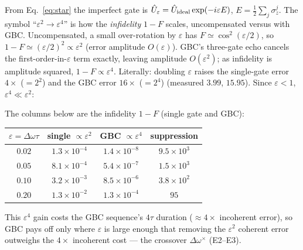 \documentclass[aps,prapplied,twocolumn,superscriptaddress,floatfix,nofootinbib]{revtex4-2}
\begin{document}
From Eq.~\eqref{eq:star} the imperfect gate is $\hat U_\varepsilon=\hat U_{\rm ideal}\exp(-i\varepsilon E)$,
$E=\tfrac12\sum_j\sigma_z^j$. The symbol ``$\varepsilon^2\!\to\!\varepsilon^4$'' is how the
\emph{infidelity} $1-F$ scales, uncompensated versus with GBC. Uncompensated, a small over-rotation
by $\varepsilon$ has $F\simeq\cos^2(\varepsilon/2)$, so $1-F\simeq(\varepsilon/2)^2\propto\varepsilon^2$
(error amplitude $O(\varepsilon)$). GBC's three-gate echo cancels the first-order-in-$\varepsilon$
term exactly, leaving amplitude $O(\varepsilon^2)$; as infidelity is amplitude squared,
$1-F\propto\varepsilon^4$. Literally: doubling $\varepsilon$ raises the single-gate error $4\times$
($=2^2$) and the GBC error $16\times$ ($=2^4$) (measured $3.99$, $15.95$). Since $\varepsilon<1$,
$\varepsilon^4\!\ll\!\varepsilon^2$:

The columns below are the infidelity $1{-}F$ (single gate and GBC):
\begin{ruledtabular}\begin{tabular}{cccc}
$\varepsilon{=}\Delta\omega\tau$ & single $\propto\varepsilon^2$ & GBC $\propto\varepsilon^4$ & suppression \\ \hline
$0.02$ & $1.3\times10^{-4}$ & $1.4\times10^{-8}$ & $9.5\times10^{3}$ \\
$0.05$ & $8.1\times10^{-4}$ & $5.4\times10^{-7}$ & $1.5\times10^{3}$ \\
$0.10$ & $3.2\times10^{-3}$ & $8.5\times10^{-6}$ & $3.8\times10^{2}$ \\
$0.20$ & $1.3\times10^{-2}$ & $1.3\times10^{-4}$ & $95$ \\
\end{tabular}\end{ruledtabular}

This $\varepsilon^4$ gain costs the GBC sequence's $4\tau$ duration ($\approx4\times$ incoherent
error), so GBC pays off only where $\varepsilon$ is large enough that removing the $\varepsilon^2$
coherent error outweighs the $4\times$ incoherent cost --- the crossover $\Delta\omega^\times$ (E2--E3).
\end{document}
